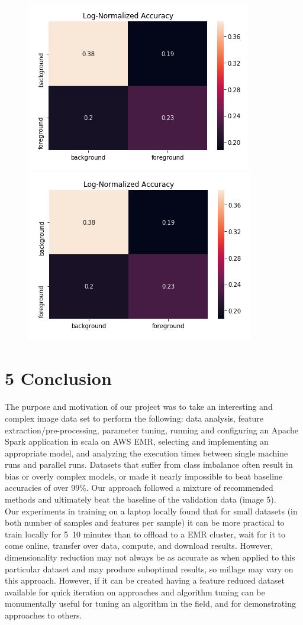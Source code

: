\documentclass{neu_handout}
\begin{document}
\begin{figure}[h]
\centering
{
\includegraphics[width=0.4\linewidth]{rflocalgini}
\label{fig:rflocalgini}
}
{
\includegraphics[width=0.4\linewidth]{rflocalentropy}
\label{fig:rflocalentropy}
}
\end{figure}



\section*{5 Conclusion}
The purpose and motivation of our project was to take an interesting and complex image data set to perform the following: data analysis, feature extraction/pre-processing, parameter tuning, running and configuring an Apache Spark application in scala on AWS EMR, selecting and implementing an appropriate model, and analyzing the execution times between single machine runs and parallel runs. Datasets that suffer from class imbalance often result in bias or overly complex models, or made it nearly impossible to beat baseline accuracies of over 99\%. Our approach followed a mixture of recommended methods and ultimately beat the baseline of the validation data (image 5).\\

Our experiments in training on a laptop locally found that for small datasets (in both number of samples and features per sample) it can be more practical to train locally for 5~10 minutes than to offload to a EMR cluster, wait for it to come online, transfer over data, compute, and download results. However, dimensionality reduction may not always be as accurate as when applied to this particular dataset and may produce suboptimal results, so millage may vary on this approach. However, if it can be created having a feature reduced dataset available for quick iteration on approaches and algorithm tuning can be monumentally useful for tuning an algorithm in the field, and for demonstrating approaches to others.
\end{document}
